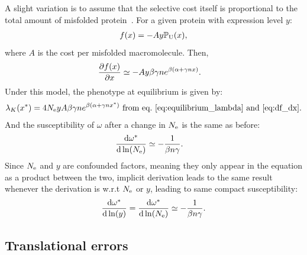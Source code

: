 \documentclass{article}
\begin{document}
A slight variation is to assume that the selective cost itself is proportional to the total amount of misfolded protein~\citep{Drummond2005a, Wilke2006, Drummond2008, Serohijos2012}. For a given protein with expression level $y$:
\begin{align}
    f (x) = - A y \mathbb{P}_{\text{U}} (x),
\end{align}
where $A$ is the cost per misfolded macromolecule.
Then,
\begin{align}
    \frac{\partial  f (x)}{\partial x} & \simeq -A y \beta \gamma n e^{\beta(\alpha + \gamma n x)}.
\end{align}
Under this model, the {phenotype} at equilibrium is given by:
\begin{align}
    \lambda_{K}(x^{*}) = 4N_{\text{e}} y A \beta \gamma n e^{\beta(\alpha + \gamma n x^{*})} \text{ from eq.~\ref{eq:equilibrium_lambda} and~\ref{eq:df_dx}}.
\end{align}
And the susceptibility of $\omega$ after a change in $N_{\text{e}}$ is the same as before:
\begin{align}
    \frac{ \mathrm{d} \omega^{*}}{\mathrm{d} \ln (N_{\text{e}})} & \simeq - \frac{1}{\beta n \gamma}.
\end{align}
Since $N_{\text{e}}$ and $y$ are confounded factors, meaning they only appear in the equation as a product between the two, implicit derivation leads to the same result whenever the derivation is w.r.t $N_{\text{e}}$ or $y$, leading to same compact susceptibility:
\begin{align}
    \frac{ \mathrm{d} \omega^{*}}{\mathrm{d} \ln (y)} = \frac{ \mathrm{d} \omega^{*}}{\mathrm{d} \ln (N_{\text{e}})} \simeq - \frac{1}{\beta n \gamma}.
\end{align}

\subsection{Translational errors}
\label{subsec:translational-errors}
\end{document}
